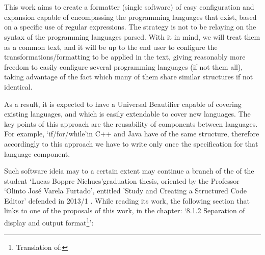 

%


\chapter{}\label{sec:implementation}


\begin{englishtext}

    This work aims to create a formatter (single software) of easy configuration
    and expansion capable of encompassing the programming languages that exist,
    based on a specific use of regular expressions. The strategy is not to be
    relaying on the syntax of the programming languages parsed. With it in mind,
    we will treat them as a common text, and it will be up to the end user to
    configure the transformations/formatting to be applied in the text, giving
    reasonably more freedom to easily configure several programming languages
    (if not them all), taking advantage of the fact which many of them share
    similar structures if not identical.

    As a result, it is expected to have a Universal Beautifier capable of
    covering existing languages, and which is easily extendable to cover new
    languages. The key points of this approach are the reusability of components
    between languages. For example, `if/for/while'\s in C++ and Java have of the
    same structure, therefore accordingly to this approach we have to write only
    once the specification for that language component.

    Such software ideia may to a certain extent may continue a branch of the of
    the student `Lucas Boppre Niehues'\s graduation thesis, oriented by the
    Professor `Olinto José Varela Furtado', entitled 'Study and Creating a
    Structured Code Editor' defended in 2013/1 \cite{structuredEditorStudy}.
    While reading its work, the following section that links to one of the
    proposals of this work, in the chapter: `8.1.2 Separation of display and
    output format\footnote{Translation of: }':


\end{englishtext}
